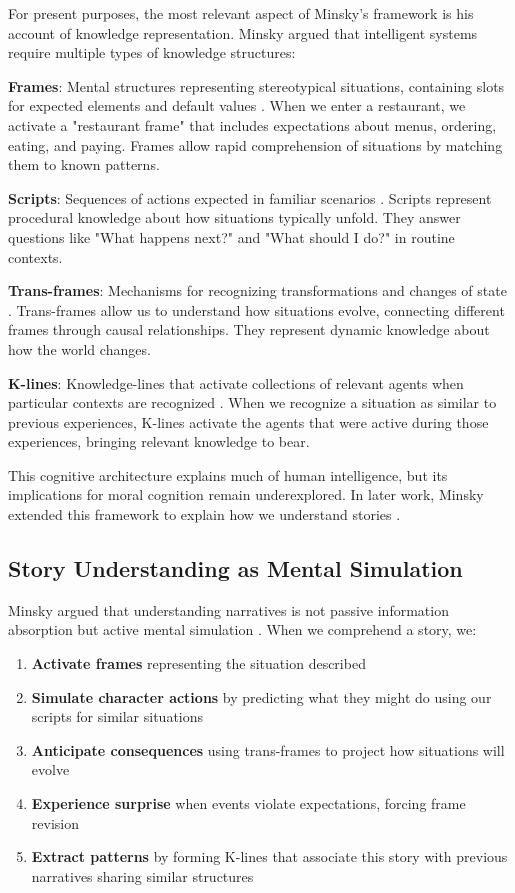 \documentclass[12pt]{article}
\begin{document}
For present purposes, the most relevant aspect of Minsky's framework is his account of knowledge representation. Minsky argued that intelligent systems require multiple types of knowledge structures:

\textbf{Frames}: Mental structures representing stereotypical situations, containing slots for expected elements and default values \citep{minsky1974framework}. When we enter a restaurant, we activate a "restaurant frame" that includes expectations about menus, ordering, eating, and paying. Frames allow rapid comprehension of situations by matching them to known patterns.

\textbf{Scripts}: Sequences of actions expected in familiar scenarios \citep{schank1977scripts}. Scripts represent procedural knowledge about how situations typically unfold. They answer questions like "What happens next?" and "What should I do?" in routine contexts.

\textbf{Trans-frames}: Mechanisms for recognizing transformations and changes of state \citep{minsky1986society}. Trans-frames allow us to understand how situations evolve, connecting different frames through causal relationships. They represent dynamic knowledge about how the world changes.

\textbf{K-lines}: Knowledge-lines that activate collections of relevant agents when particular contexts are recognized \citep{minsky1986society}. When we recognize a situation as similar to previous experiences, K-lines activate the agents that were active during those experiences, bringing relevant knowledge to bear.

This cognitive architecture explains much of human intelligence, but its implications for moral cognition remain underexplored. In later work, Minsky extended this framework to explain how we understand stories \citep{minsky2006emotion}.

\subsection{Story Understanding as Mental Simulation}

Minsky argued that understanding narratives is not passive information absorption but active mental simulation \citep{minsky2006emotion}. When we comprehend a story, we:

\begin{enumerate}
\item \textbf{Activate frames} representing the situation described
\item \textbf{Simulate character actions} by predicting what they might do using our scripts for similar situations
\item \textbf{Anticipate consequences} using trans-frames to project how situations will evolve
\item \textbf{Experience surprise} when events violate expectations, forcing frame revision
\item \textbf{Extract patterns} by forming K-lines that associate this story with previous narratives sharing similar structures
\end{enumerate}
\end{document}
